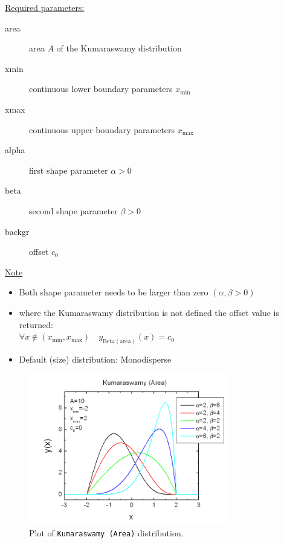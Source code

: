 \underline{Required parameters:}
\begin{description}
    \item[area] area $A$ of the Kumaraswamy distribution
    \item[xmin] continuous lower boundary parameters $x_\mathrm{min}$
    \item[xmax] continuous upper boundary parameters $x_\mathrm{max}$
    \item[alpha] first shape parameter $\alpha>0$
    \item[beta]  second shape parameter $\beta>0$
    \item[backgr] offset $c_0$
\end{description}

\underline{Note}
\begin{itemize}
  \item Both shape parameter needs to be larger than zero $(\alpha,\beta>0)$
  \item where the Kumaraswamy distribution is not defined the offset value is returned: \\
  $\forall x\notin (x_\mathrm{min},x_\mathrm{max})\quad y_\mathrm{Beta (area)}(x) = c_0$
  \item Default (size) distribution: Monodisperse
\end{itemize}

\begin{figure}[htb]
\begin{center}
\includegraphics[width=0.768\textwidth]{KumaraswamyArea.png}
\end{center}
\caption{Plot of \texttt{Kumaraswamy (Area)} distribution.}
\label{fig:KumaraswamyArea}
\end{figure}

\clearpage
